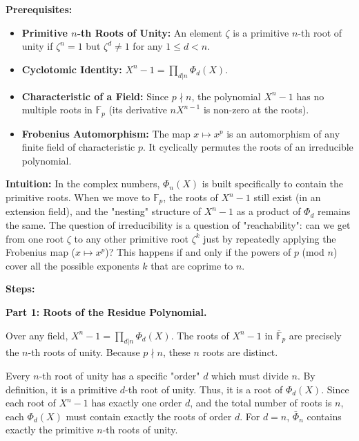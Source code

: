 \begin{solution}
\textbf{Prerequisites:}
\begin{itemize}
    \item \textbf{Primitive $n$-th Roots of Unity:} An element $\zeta$ is a primitive $n$-th root of unity if $\zeta^n = 1$ but $\zeta^d \neq 1$ for any $1 \leq d < n$.
    \item \textbf{Cyclotomic Identity:} $X^n - 1 = \prod_{d|n} \Phi_d(X)$.
    \item \textbf{Characteristic of a Field:} Since $p \nmid n$, the polynomial $X^n - 1$ has no multiple roots in $\mathbb{F}_p$ (its derivative $n X^{n-1}$ is non-zero at the roots).
    \item \textbf{Frobenius Automorphism:} The map $x \mapsto x^p$ is an automorphism of any finite field of characteristic $p$. It cyclically permutes the roots of an irreducible polynomial.
\end{itemize}

\bigskip

\textbf{Intuition:}
In the complex numbers, $\Phi_n(X)$ is built specifically to contain the primitive roots. When we move to $\mathbb{F}_p$, the roots of $X^n-1$ still exist (in an extension field), and the "nesting" structure of $X^n-1$ as a product of $\Phi_d$ remains the same. The question of irreducibility is a question of "reachability": can we get from one root $\zeta$ to any other primitive root $\zeta^k$ just by repeatedly applying the Frobenius map ($x \mapsto x^p$)? This happens if and only if the powers of $p$ (mod $n$) cover all the possible exponents $k$ that are coprime to $n$.

\bigskip

\textbf{Steps:}

\textbf{Part 1: Roots of the Residue Polynomial.}

Over any field, $X^n - 1 = \prod_{d|n} \Phi_d(X)$. The roots of $X^n - 1$ in $\bar{\mathbb{F}}_p$ are precisely the $n$-th roots of unity. Because $p \nmid n$, these $n$ roots are distinct.

\bigskip

Every $n$-th root of unity has a specific "order" $d$ which must divide $n$. By definition, it is a primitive $d$-th root of unity. Thus, it is a root of $\Phi_d(X)$. Since each root of $X^n-1$ has exactly one order $d$, and the total number of roots is $n$, each $\Phi_d(X)$ must contain exactly the roots of order $d$. For $d=n$, $\bar{\Phi}_n$ contains exactly the primitive $n$-th roots of unity.


\end{solution}
